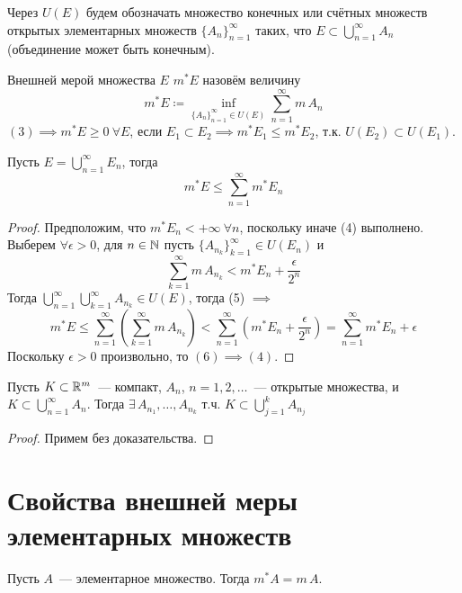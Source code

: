 \documentclass[main]{subfiles}
\begin{document}
\begin{remark}
    Через $U(E)$ будем обозначать множество конечных или счётных множеств открытых элементарных множеств $\{A_n\}^\infty_{n=1}$ таких, что $E\subset\bigcup_{n=1}^{\infty} A_n$ (объединение может быть конечным).
\end{remark}

\begin{definition}
    Внешней мерой множества $E$ $m^*E$ назовём величину
    \[ m^*E \coloneq \inf_{\{A_n\}^\infty_{n=1}\in U(E)} \sum_{n=1}^{\infty} m\,A_n\tag{3} \]
    $(3) \implies m^*E\ge 0\ \forall E$, если $E_1\subset E_2\implies m^*E_1\le m^*E_2$, т.к. $U(E_2)\subset U(E_1)$.
\end{definition}

\begin{theorem}
    Пусть $E=\bigcup_{n=1}^{\infty} E_n$, тогда \[m^*E\le\sum_{n=1}^{\infty} m^*E_n\tag{4}\]
\end{theorem}

\begin{proof}
    Предположим, что $m^*E_n<+\infty\ \forall n$, поскольку иначе (4) выполнено.
    Выберем $\forall\epsilon>0$, для $n\in\mathbb{N}$ пусть $\{A_{n_k}\}^\infty_{k=1}\in U(E_n)$ и
    \[ \sum_{k=1}^{\infty} m\,A_{n_k}< m^*E_n+\frac{\epsilon}{2^n}\tag{5} \]
    Тогда $\bigcup_{n=1}^{\infty} \bigcup_{k=1}^\infty A_{n_k}\in U(E)$, тогда (5) $\implies$
    \[ m^*E\le\sum_{n=1}^{\infty} \left( \sum_{k=1}^{\infty} m\,A_{n_k} \right) < \sum_{n=1}^{\infty} \left(m^*E_n+\frac{\epsilon}{2^n}\right) = \sum_{n=1}^{\infty} m^*E_n+\epsilon\tag{6} \]
    Поскольку $\epsilon>0$ произвольно, то $(6)\implies (4)$.
\end{proof}

\begin{lemma}[Бореля]
    Пусть $K\subset\mathbb{R}^m$~--- компакт, $A_n$, $n=1, 2, \dots$~--- открытые множества, и $K\subset\bigcup_{n=1}^{\infty} A_n$.
    Тогда $\exists\,A_{n_1}, \dots,A_{n_k}$ т.ч. $K\subset \bigcup_{j=1}^k A_{n_j}$
\end{lemma}

\begin{proof}
    Примем без доказательства.
\end{proof}

\section{Свойства внешней меры элементарных множеств}
\begin{theorem}
    Пусть $A$~--- элементарное множество.
    Тогда $m^*A=m\,A$.
\end{theorem}
\end{document}
